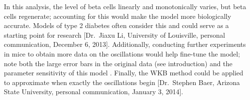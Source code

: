 In this analysis, the level of beta cells linearly and monotonically varies,
but beta cells regenerate; accounting for this would make the model more
biologically accurate. Models of type 2 diabetes often consider this and
could serve as a starting point for research [Dr.\ Jiaxu Li, University of
  Louisville, personal communication, December 6, 2013]. Additionally,
conducting further experiments in mice to obtain more data on the
oscillations would help fine-tune the model; note both the large error bars
in the original data (see introduction) and the parameter sensitivity of
this model \cite{Mahaffy2007}. Finally, the WKB method could be applied to
approximate when exactly the oscillations begin [Dr.\ Stephen Baer, Arizona
  State University, personal communication, January 3, 2014].
